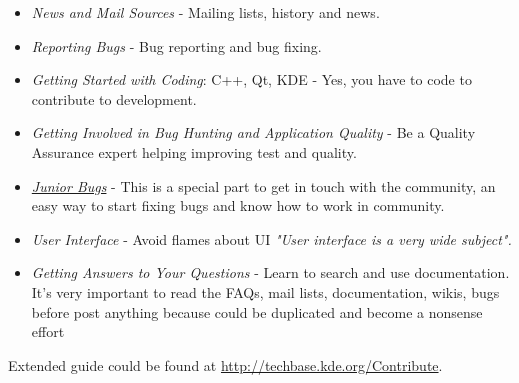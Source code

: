 \begin{itemize}
	\item \textit{News and Mail Sources} - Mailing lists, history and news.
	\item \textit{Reporting Bugs} - Bug reporting and bug fixing.
	\item \textit{Getting Started with Coding}:  C++, Qt,  KDE - Yes, you have to code to contribute to development.
	\item \textit{Getting Involved in Bug Hunting and Application Quality} - Be a Quality Assurance expert helping improving test and quality. 
	\item \href{http://community.kde.org/KDE/Junior_Jobs}{\textit{Junior Bugs}} - This is a special part to get in touch with the community, an easy way to start fixing bugs and know how to work in community.
	\item \textit{User Interface} - Avoid flames about UI \textit{"User interface is a very wide subject".}
	\item \textit{Getting Answers to Your Questions} - Learn to search and use documentation. It's very important to read the FAQs, mail lists, documentation, wikis, bugs before post anything because could be duplicated and become a nonsense effort
\end{itemize}

\par Extended guide could be found at \href{http://techbase.kde.org/Contribute}{http://techbase.kde.org/Contribute}.


